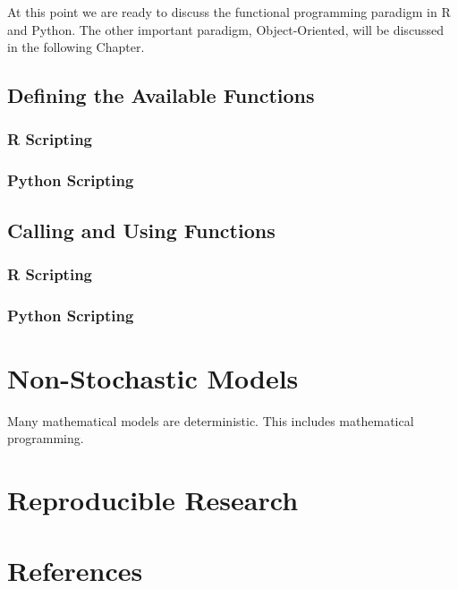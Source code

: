 \documentclass[]{book}
\theoremstyle{definition}
\theoremstyle{definition}
\theoremstyle{definition}
\theoremstyle{remark}
\begin{document}
At this point we are ready to discuss the functional programming
paradigm in R and Python. The other important paradigm, Object-Oriented,
will be discussed in the following Chapter.

\section{Defining the Available
Functions}\label{defining-the-available-functions}

\subsection{R Scripting}\label{r-scripting-11}

\subsection{Python Scripting}\label{python-scripting-11}

\section{Calling and Using
Functions}\label{calling-and-using-functions-2}

\subsection{R Scripting}\label{r-scripting-12}

\subsection{Python Scripting}\label{python-scripting-12}

\chapter{Non-Stochastic Models}\label{non-stochastic-models}

Many mathematical models are deterministic. This includes mathematical
programming.

\chapter{Reproducible Research}\label{reproducible-research}

\chapter{References}\label{references}
\end{document}
